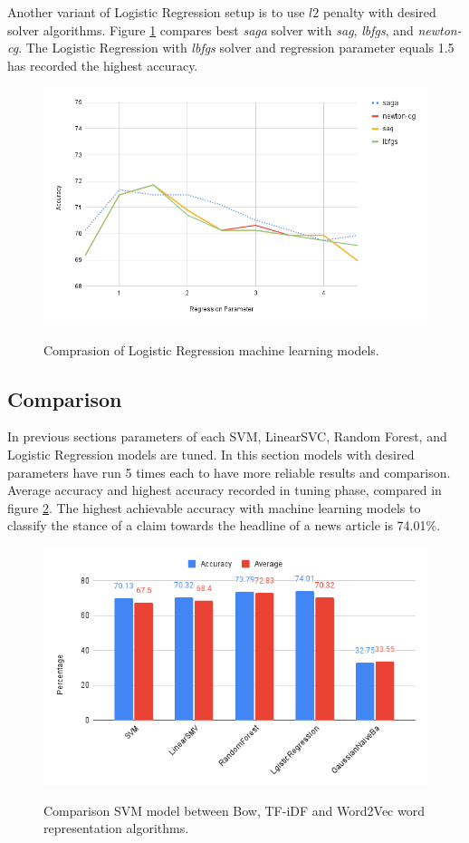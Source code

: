 Another variant of Logistic Regression setup is to use $l2$ penalty with desired solver algorithms. Figure \ref{fig:logistic3} compares best \textit{saga} solver with \textit{sag}, \textit{lbfgs}, and \textit{newton-cg}. The Logistic Regression with \textit{lbfgs} solver and regression parameter equals 1.5 has recorded the highest accuracy. 
\begin{figure}%
	\centering
	{\includegraphics[width=12.5cm]{statistics/logistic1.png} }
	\caption{Comprasion of Logistic Regression machine learning models.}%
	\label{fig:logistic3}%
\end{figure}

\subsection{Comparison}
In previous sections parameters of each SVM, LinearSVC, Random Forest, and Logistic Regression models are tuned. In this section models with desired parameters have run 5 times each to have more reliable results and comparison. Average accuracy and highest accuracy recorded in tuning phase, compared in figure \ref{fig:all}. The highest achievable accuracy with machine learning models to classify the stance of a claim towards the headline of a news article is 74.01\%.
\begin{figure}%
	\centering
	{\includegraphics[width=12.5cm]{statistics/machinlearning.png} }
	\caption{Comparison SVM model between Bow, TF-iDF and Word2Vec word representation algorithms.}%
	\label{fig:all}%
\end{figure}
